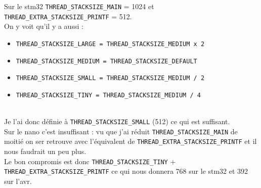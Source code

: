 Sur le stm32 \texttt{THREAD\_STACKSIZE\_MAIN} = 1024 et 
\texttt{THREAD\_EXTRA\_STACKSIZE\_PRINTF} = 512.\\

On y voit qu'il y a aussi :\\
\begin{itemize}
\item \texttt{THREAD\_STACKSIZE\_LARGE = THREAD\_STACKSIZE\_MEDIUM x 2}
\item \texttt{THREAD\_STACKSIZE\_MEDIUM = THREAD\_STACKSIZE\_DEFAULT}
\item \texttt{THREAD\_STACKSIZE\_SMALL = THREAD\_STACKSIZE\_MEDIUM / 2}
\item \texttt{THREAD\_STACKSIZE\_TINY = THREAD\_STACKSIZE\_MEDIUM / 4}
\end{itemize}~\\

Je l'ai donc définie à \texttt{THREAD\_STACKSIZE\_SMALL} (512) ce qui
est suffisant.\\

Sur le nano c'est insuffisant : vu que j'ai réduit
\texttt{THREAD\_STACKSIZE\_MAIN} de moitié on ser retrouve avec
l'équivalent de \texttt{THREAD\_EXTRA\_STACKSIZE\_PRINTF} et il nous 
faudrait un peu plus.\\

Le bon compromis est donc \texttt{THREAD\_STACKSIZE\_TINY} +
\texttt{THREAD\_EXTRA\_STACKSIZE\_PRINTF} ce qui nous donnera 768 sur le
stm32 et 392 sur l'avr.
